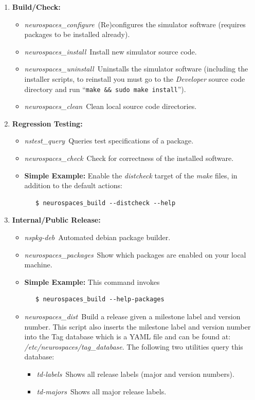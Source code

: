 \documentclass[12pt]{article}
\begin{document}
\begin{enumerate}
   \item{\bf Build/Check:}
   \begin{itemize}
      \item {\it neurospaces\_configure}\,\,\,(Re)configures the simulator software (requires packages to be installed already).
      \item {\it neurospaces\_install}\,\,\,Install new simulator source code.
      \item {\it neurospaces\_uninstall}\,\,\,Uninstalls the simulator software (including the installer scripts, to reinstall you must go to the {\it Developer} source code directory and run ``{\tt make \&\& sudo make install}'').
      \item {\it neurospaces\_clean}\,\,\,Clean local source code directories. 
   \end{itemize}
  
   \item {\bf Regression Testing:}
   \begin{itemize}
      \item {\it nstest\_query}\,\,\,Queries test specifications of a package.
      \item {\it neurospaces\_check}\,\,\,Check for correctness of the installed software.
      \item{\bf Simple Example:} Enable the {\it distcheck} target of the {\it make} files, in addition to the default actions:
      \begin{verbatim}
   $ neurospaces_build --distcheck --help
      \end{verbatim}
   \end{itemize}
 
   \item {\bf Internal/Public Release:}
   \begin{itemize}
      \item {\it nspkg-deb}\,\,\,Automated debian package builder.
      \item {\it neurospaces\_packages}\,\,\,Show which packages are enabled on your local machine.
      \item{\bf Simple Example:} This command invokes 
      \begin{verbatim}
   $ neurospaces_build --help-packages
      \end{verbatim}
      \item {\it neurospaces\_dist}\,\,\,Build a release given a milestone label and version number. This script also inserts the milestone label and version number into the Tag database which is a YAML file and can be found at: {\it /etc/neurospaces/tag\_database}. The following two utilities query this database:
      \begin{itemize}
         \item {\it td-labels}\,\,\,Shows all release labels (major and version numbers).
         \item {\it td-majors}\,\,\,Shows all major release labels.
      \end{itemize}


\end{itemize}
\end{enumerate}
\end{document}
